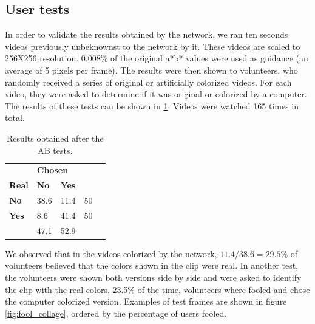 \documentclass[12pt,openright,oneside,a4paper,english]{abntex2}
\begin{document}
\begin{otherlanguage}{english}

    \section{User tests}

    In order to validate the results obtained by the network, we ran ten seconds videos previously unbeknownst to the network by it. These videos are scaled to 256X256 resolution. 0.008\% of the original a*b* values were used as guidance (an average of 5 pixels per frame). The results were then shown to volunteers, who randomly received a series of original or artificially colorized videos. For each video, they were asked to determine if it was original or colorized by a computer. The results of these tests can be shown in \ref{table:ABresults}. Videos were watched 165 times in total.

    \begin{table}[H]
    \centering
    \begin{tabular}{l|l|l|ll}
    \cline{2-3}
                                        & \multicolumn{2}{l|}{\textbf{Chosen}} &                           &  \\ \cline{1-3}
    \multicolumn{1}{|l|}{\textbf{Real}} & \textbf{No}      & \textbf{Yes}      &                           &  \\ \cline{1-4}
    \multicolumn{1}{|l|}{\textbf{No}}   & 38.6             & 11.4              & \multicolumn{1}{l|}{50} &  \\ \cline{1-4}
    \multicolumn{1}{|l|}{\textbf{Yes}}  & 8.6              & 41.4              & \multicolumn{1}{l|}{50} &  \\ \cline{1-4}
                                        & 47.1             & 52.9              &                           &  \\ \cline{2-3}
    \end{tabular}
    \label{table:ABresults}
    \caption{Results obtained after the AB tests.}
    \end{table}

    We observed that in the videos colorized by the network, \(11.4/38.6 = 29.5\% \) of volunteers  believed that the colors shown in the clip were real. In another test, the volunteers were shown both versions side by side and were asked to identify the clip with the real colors. 23.5\% of the time, volunteers where fooled and chose the computer colorized version. Examples of test frames are shown in figure \ref{fig:fool_collage}, ordered by the percentage of users fooled.


\end{otherlanguage}
\end{document}
